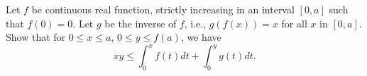Let $f$ be continuous real function, strictly increasing in an interval $[0,
a]$ such that $f(0) = 0$. Let $g$ be the inverse of $f$, i.e., $g(f(x)) = x$
for all $x$ in $[0, a]$. Show that for $0 \le x \le a$, $0 \le y \le f(a)$, we
have $$ xy \le \int_{0}^{x} f(t) dt + \int_{0}^{y} g(t) dt. $$

